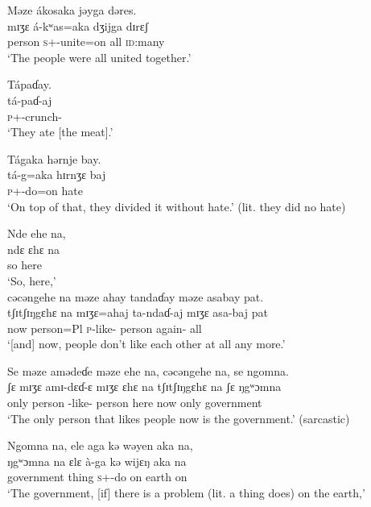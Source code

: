 \ea Məze  ákosaka  jəyga  dəres. \\
\gll mɪʒɛ   á-kʷas=aka   dʒijga   dɪrɛʃ\\
 person  \textsc{s}+{\IFV}-unite=on  all  \textsc{id}:many\\
 \glt ‘The people were all united together.’
\z

\ea  Tápaɗay.\\ 
 \gll tá-paɗ-aj \\
 \textsc{p}+{\IFV}-crunch{}-{\CL}\\
 \glt ‘They ate [the meat].’
 \z

\ea Tágaka  hərnje  bay.\\
 \gll tá-g=aka   hɪrnʒɛ   baj\\
 \textsc{p}+{\IFV}-do=on  hate  {\NEG}\\
 \glt ‘On top of that, they divided it without hate.’ (lit. they did no hate)
 \z

\ea Nde  ehe  na,   \\
 \gll ndɛ   ɛhɛ      na \\
 so  here   {\PSP}     \\
 \glt ‘So, here,’\\
 
 \medskip
 cəcəngehe  na  məze  ahay  tandaɗay  məze  asabay  pat.\\
 \gll tʃɪtʃɪŋgɛhɛ  na   mɪʒɛ=ahaj   ta-ndaɗ-aj     mɪʒɛ  asa-baj     pat\\
 now           {\PSP}  person=Pl  \textsc{p}-like-{\CL}    person  again-{\NEG}  all\\
 \glt ‘[and] now, people don’t like each other at all any more.’
 \z

\ea Se  məze  amədeɗe  məze  ehe  na, cəcəngehe  na,  se  ngomna.   \\
 \gll ʃɛ    mɪʒɛ     amɪ-dɛɗ-ɛ  mɪʒɛ  ɛhɛ     na tʃɪtʃɪŋgɛhɛ  na   ʃɛ   ŋgʷɔmna\\
 only    person  {\DEP}-like-{\CL}  person  here  {\PSP}  now    {\PSP}  only  government \\
 \glt ‘The only person that likes people now is the government.’ (sarcastic)\\
 \z
 
\ea Ngomna  na,    ele  aga  kə  wəyen  aka  na,\\
 \gll ŋgʷɔmna   na  ɛlɛ   à-ga     kə  wijɛŋ   aka  na\\
 government  {\PSP}  thing  \textsc{s}+{\PFV}-do  on    earth  on      {\PSP}  \\
 \glt ‘The government, [if]  there is a problem (lit. a thing does) on the earth,’\\
 
